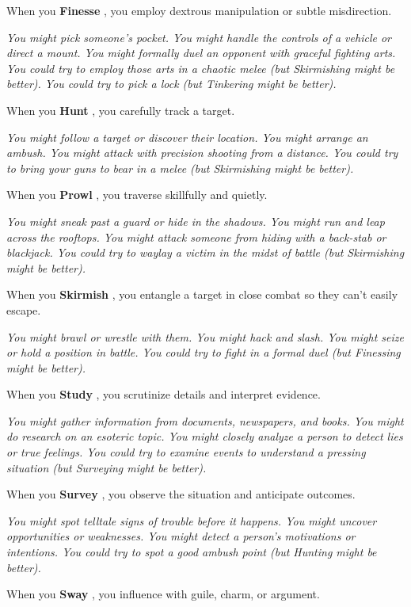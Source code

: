 \documentclass[11pt,fleqn,a5paper]{book}
\newcommand{\gameterm}[1]{\textbf{#1}}
\begin{document}
When you \gameterm{Finesse} , you employ dextrous manipulation or subtle misdirection.

\emph{You might pick someone’s pocket. You might handle the controls of a vehicle or direct a mount. You might formally duel an opponent with graceful fighting arts. You could try to employ those arts in a chaotic melee (but Skirmishing might be better). You could try to pick a lock (but Tinkering might be better).}

When you \gameterm{Hunt} , you carefully track a target.

\emph{You might follow a target or discover their location. You might arrange an ambush. You might attack with precision shooting from a distance. You could try to bring your guns to bear in a melee (but Skirmishing might be better).}

When you \gameterm{Prowl} , you traverse skillfully and quietly.

\emph{You might sneak past a guard or hide in the shadows. You might run and leap across the rooftops. You might attack someone from hiding with a back-stab or blackjack. You could try to waylay a victim in the midst of battle (but Skirmishing might be better).}

When you \gameterm{Skirmish} , you entangle a target in close combat so they can’t easily escape.

\emph{You might brawl or wrestle with them. You might hack and slash. You might seize or hold a position in battle. You could try to fight in a formal duel (but Finessing might be better).}

When you \gameterm{Study} , you scrutinize details and interpret evidence.

\emph{You might gather information from documents, newspapers, and books. You might do research on an esoteric topic. You might closely analyze a person to detect lies or true feelings. You could try to examine events to understand a pressing situation (but Surveying might be better).}

When you \gameterm{Survey} , you observe the situation and anticipate outcomes.

\emph{You might spot telltale signs of trouble before it happens. You might uncover opportunities or weaknesses. You might detect a person’s motivations or intentions. You could try to spot a good ambush point (but Hunting might be better).}

When you \gameterm{Sway} , you influence with guile, charm, or argument.
\end{document}
